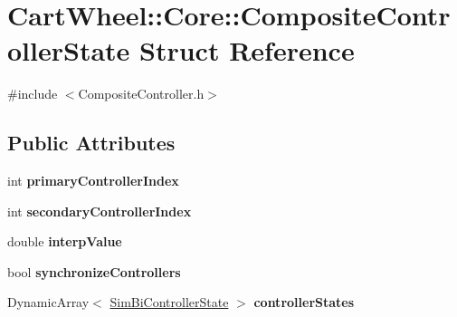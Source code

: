 \hypertarget{structCartWheel_1_1Core_1_1CompositeControllerState}{
\section{CartWheel::Core::CompositeControllerState Struct Reference}
\label{structCartWheel_1_1Core_1_1CompositeControllerState}
}


{\ttfamily \#include $<$CompositeController.h$>$}

\subsection*{Public Attributes}
\begin{DoxyCompactItemize}
\item 
\hypertarget{structCartWheel_1_1Core_1_1CompositeControllerState_aaf007eb2d1eec3f2e78767297a7744f6}{
int {\bfseries primaryControllerIndex}}
\label{structCartWheel_1_1Core_1_1CompositeControllerState_aaf007eb2d1eec3f2e78767297a7744f6}

\item 
\hypertarget{structCartWheel_1_1Core_1_1CompositeControllerState_a86e0e53bcbab09f9df76b7d167483a23}{
int {\bfseries secondaryControllerIndex}}
\label{structCartWheel_1_1Core_1_1CompositeControllerState_a86e0e53bcbab09f9df76b7d167483a23}

\item 
\hypertarget{structCartWheel_1_1Core_1_1CompositeControllerState_a1822d8ce0887d20ed7d249f473c60b36}{
double {\bfseries interpValue}}
\label{structCartWheel_1_1Core_1_1CompositeControllerState_a1822d8ce0887d20ed7d249f473c60b36}

\item 
\hypertarget{structCartWheel_1_1Core_1_1CompositeControllerState_adbd5e93e2d162e91ca8c7f10737e0486}{
bool {\bfseries synchronizeControllers}}
\label{structCartWheel_1_1Core_1_1CompositeControllerState_adbd5e93e2d162e91ca8c7f10737e0486}

\item 
\hypertarget{structCartWheel_1_1Core_1_1CompositeControllerState_af8dda1f15a2dce23a26d450c2aa3c7b3}{
DynamicArray$<$ \hyperlink{structCartWheel_1_1Core_1_1SimBiControllerState}{SimBiControllerState} $>$ {\bfseries controllerStates}}
\label{structCartWheel_1_1Core_1_1CompositeControllerState_af8dda1f15a2dce23a26d450c2aa3c7b3}

\end{DoxyCompactItemize}


